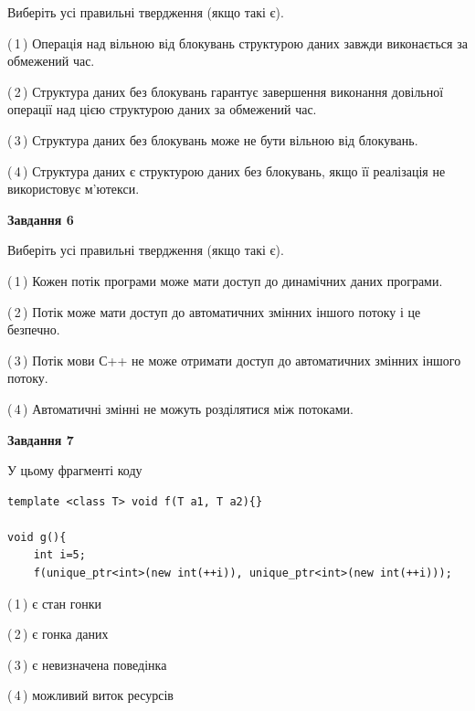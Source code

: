 \documentclass[12pt, ukrainian]{article}
\begin{document}
\begin {large}
{Виберіть усі правильні твердження (якщо такі є).\par
\vspace{2mm}

(\,1\,) Операція над вільною від блокувань структурою даних завжди виконається за обмежений час.%

(\,2\,) Структура даних без блокувань гарантує завершення виконання довільної операції над цією структурою даних за обмежений час.%

(\,3\,) Структура даних без блокувань може не бути вільною від блокувань.%

(\,4\,) Структура даних є структурою даних без блокувань, якщо її реалізація не використовує м’ютекси.%
\newpage


\begin{center}
\textbf{Завдання 6}
\end{center}

Виберіть усі правильні твердження (якщо такі є).\par
\vspace{2mm}

(\,1\,) Кожен потік програми може мати доступ до динамічних даних програми.%

(\,2\,) Потік може мати доступ до автоматичних змінних іншого потоку і це безпечно.%

(\,3\,) Потік мови С++ не може отримати доступ до автоматичних змінних іншого потоку.%

(\,4\,) Автоматичні змінні не можуть розділятися між потоками.%


\begin{center}
\textbf{Завдання 7}
\end{center}

У цьому фрагменті коду
\begin{verbatim}
template <class T> void f(T a1, T a2){}

void g(){
    int i=5;
    f(unique_ptr<int>(new int(++i)), unique_ptr<int>(new int(++i)));
\end{verbatim}

(\,1\,) є стан гонки%

(\,2\,) є гонка даних%

(\,3\,) є невизначена поведінка%

(\,4\,) можливий виток ресурсів%

}
\end {large}

\vspace{4mm}
\newpage
\end{document}
